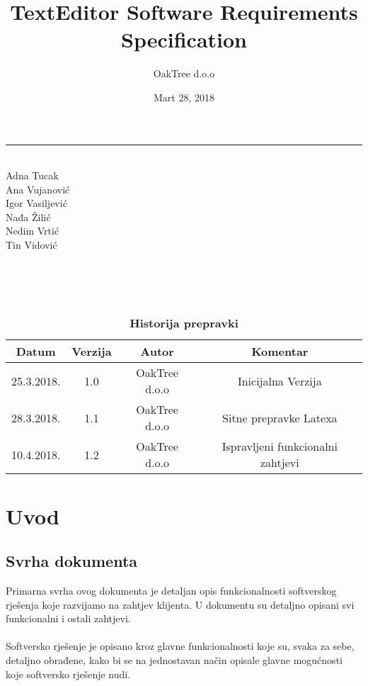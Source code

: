 \documentclass[12pt]{article}
\date{Mart 28, 2018}
\begin{document}
\setlength{\droptitle}{5em}

\title{\Huge \textbf{TextEditor Software Requirements Specification}}
\author{\LARGE OakTree d.o.o}
\clearpage\maketitle

{\centering

\rule{10cm}{0.4pt}
\vspace{1.2cm} \\
Adna Tucak \\ Ana Vujanović \\ Igor Vasiljević \\
Nađa Žilić \\ Nedim Vrtić \\ Tin Vidović \\
}
\thispagestyle{empty}
\newpage
\tableofcontents \mbox{} \\ \\ \\
\begin{table}[h]
\centering
\caption*{\large \textbf{Historija prepravki} }
\label{my-label}
\def\arraystretch{1.25}
\setlength\tabcolsep{1.5em}
\begin{tabular}{|c|c|c|c|} \hline
 \textbf{Datum} & \textbf{Verzija} & \textbf{Autor} & \textbf{Komentar}  \\ \hline
 25.3.2018. & 1.0 & OakTree d.o.o & Inicijalna Verzija  \\ \hline
 28.3.2018. & 1.1 & OakTree d.o.o & Sitne prepravke Latexa  \\ \hline
 10.4.2018. & 1.2 & OakTree d.o.o & Ispravljeni funkcionalni zahtjevi  \\ \hline
\end{tabular}
\end{table}

\newpage

\section{Uvod}

\subsection{Svrha dokumenta}

Primarna svrha ovog dokumenta je detaljan opis funkcionalnosti softverskog rješenja koje razvijamo na zahtjev klijenta. U dokumentu su detaljno opisani svi funkcionalni i ostali zahtjevi.\\ \\
Softversko rješenje je opisano kroz glavne funkcionalnosti koje su, svaka za sebe, detaljno obrađene, kako bi se na jednostavan način opisale glavne mogućnosti koje softversko rješenje nudi.
\end{document}
